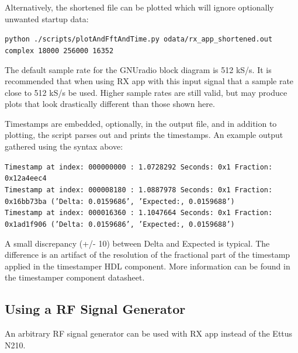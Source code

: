\noindent Alternatively, the shortened file can be plotted which will ignore optionally unwanted startup data:\par\medskip
\noindent\texttt{python ./scripts/plotAndFftAndTime.py odata/rx\_app\_shortened.out complex 18000 256000 16352}\par\medskip
\noindent The default sample rate for the GNUradio block diagram is 512 kS/s. It is recommended that when using RX app with this input signal that a sample rate close to 512 kS/s be used. Higher sample rates are still valid, but may produce plots that look drastically different than those shown here.\par\medskip
\noindent Timestamps are embedded, optionally, in the output file, and in addition to plotting, the script parses out and prints the timestamps. An example output gathered using the syntax above:\par\medskip
\scriptsize\noindent\texttt{Timestamp at index: 000000000 :  1.0728292 Seconds: 0x1 Fraction: 0x12a4eec4  \\
Timestamp at index: 000008180 :  1.0887978 Seconds: 0x1 Fraction: 0x16bb73ba ('Delta: 0.0159686', 'Expected:, 0.0159688')\\
Timestamp at index: 000016360 :  1.1047664 Seconds: 0x1 Fraction: 0x1ad1f906 ('Delta: 0.0159686', 'Expected:, 0.0159688')}\par\medskip
\noindent\small A small discrepancy (+/- 10) between Delta and Expected is typical. The difference is an artifact of the resolution of the fractional part of the timestamp applied in the timestamper HDL component. More information can be found in the timestamper component datasheet.\par\medskip
\par\medskip

\subsection{Using a RF Signal Generator}
\noindent An arbitrary RF signal generator can be used with RX app instead of the Ettus N210. \\

